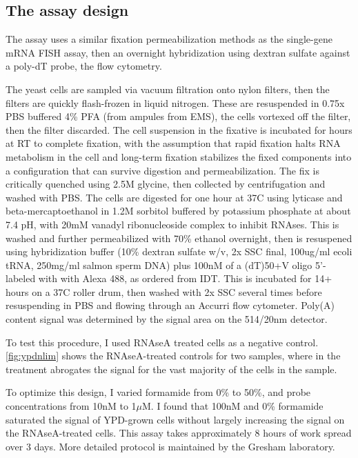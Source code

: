 %
%
%
\subsection{The assay design}
%
%
%

The assay uses a similar fixation permeabilization methods as the
single-gene mRNA FISH assay, then an overnight hybridization using
dextran sulfate against a poly-dT probe, the flow cytometry.

The yeast cells are sampled via vacuum filtration onto nylon
filters, then the filters are quickly flash-frozen in liquid nitrogen.
These are resuspended in 0.75x PBS buffered 4\% PFA (from ampules from
EMS), the cells vortexed off the filter, then the filter discarded.
The cell suspension in the fixative is incubated for hours at RT to
complete fixation, with the assumption that rapid fixation halts
RNA metabolism in the cell and long-term fixation stabilizes the fixed
components into a configuration that can survive digestion and 
permeabilization. The fix is critically quenched using 2.5M glycine,
then collected by centrifugation and washed with PBS. The cells are
digested for one hour at 37C using lyticase and beta-mercaptoethanol
in 1.2M sorbitol buffered
by potassium phosphate at about 7.4 pH, with 20mM vanadyl
ribonucleoside complex to inhibit RNAses. 
This is washed and further permeabilized with 70\% ethanol overnight,
then is resuspened using hybridization buffer
(10\% dextran sulfate w/v, 2x SSC final, 100ug/ml ecoli tRNA, 
250mg/ml salmon sperm DNA) plus 100nM of a (dT)50+V oligo 5'-labeled
with with Alexa 488, as ordered from IDT. 
This is incubated for 14+ hours on a 37C roller drum, then washed with
2x SSC several times before resuspending in PBS and flowing through an
Accurri flow cytometer.
Poly(A) content signal was determined by the signal area on the
514/20nm detector.

To test this procedure, I used RNAseA treated cells as a negative
control.
\autoref{fig:ypdnlim} shows the RNAseA-treated controls for two
samples, where in the treatment abrogates the signal for the vast
majority of the cells in the sample.

To optimize this design, I varied formamide from 0\% to 50\%, and
probe concentrations from 10nM to 1$\mu$M. I found that 100nM and 0\%
formamide saturated the signal of YPD-grown cells without largely
increasing the signal on the RNAseA-treated cells.
This assay takes approximately 8 hours of work spread over 3 days.
More detailed protocol is maintained by the Gresham laboratory.

